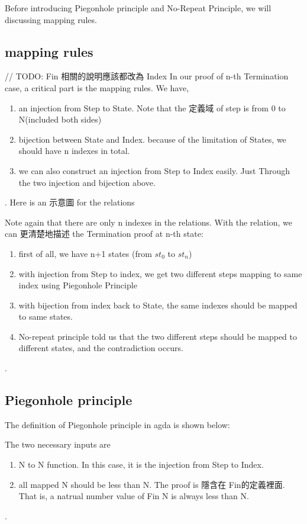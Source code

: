 Before introducing Piegonhole principle and No-Repeat Principle, we will discussing mapping rules.

\subsection{ mapping rules }
// TODO: Fin 相關的說明應該都改為 Index
In our proof of n-th Termination case, a critical part is the mapping rules.
We have,
\begin{enumerate}[1.]
    \item an injection from Step to State.  Note that the 定義域 of step is from 0 to N(included both sides)
    \item bijection between State and Index. because of the limitation of States, we should have n indexes in total.
    \item we can also construct an injection from Step to Index easily.  Just Through the two injection and bijection above.
\end{enumerate}.
Here is an 示意圖 for the relations


Note again that there are only n indexes in the relations.
With the relation, we can 更清楚地描述 the Termination proof at n-th state:
\begin{enumerate}[1.]
    \item first of all, we have n+1 states (from $st_{0}$ to $st_{n}$)
    \item with injection from Step to index, we get two different steps mapping to same index using Piegonhole Principle
    \item with bijection from index back to State, the same indexes should be mapped to same states.
    \item No-repeat principle told us that the two different steps should be mapped to different states, and the contradiction occurs.
\end{enumerate}.

\subsection{ Piegonhole principle }
The definition of Piegonhole principle in agda is shown below:



The two necessary inputs are 
\begin{enumerate}[1.]
    \item N to N function. In this case, it is the injection from Step to Index. 
    \item all mapped N should be less than N.  The proof is 隱含在 Fin的定義裡面.  That is, a natrual number value of Fin N is always less than N.
\end{enumerate}.

